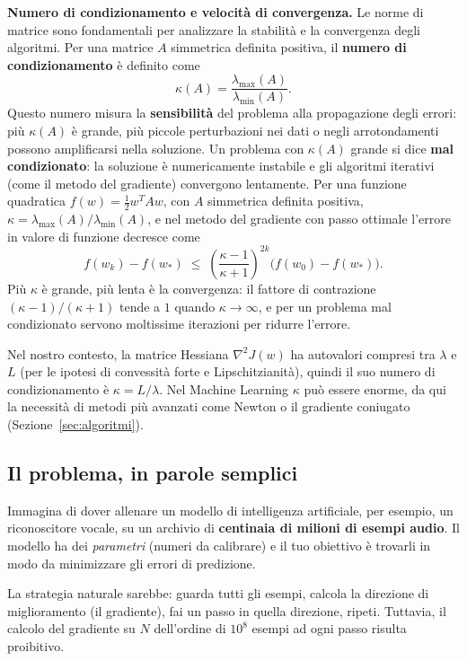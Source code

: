 \documentclass[a4paper,12pt]{article}
\numberwithin{equation}{section}
\numberwithin{figure}{section}
\numberwithin{table}{section}
\begin{document}
 \begin{mnbox}
  \textbf{Numero di condizionamento e velocit\`a di convergenza.}
  Le norme di matrice sono fondamentali per analizzare la stabilit\`a e la
  convergenza degli algoritmi. Per una matrice $A$ simmetrica definita
  positiva, il \textbf{numero di condizionamento} \`e definito come
  \[
  \kappa(A) = \frac{\lambda_{\max}(A)}{\lambda_{\min}(A)}.
  \]
  Questo numero misura la \textbf{sensibilit\`a} del problema alla
  propagazione degli errori: pi\`u $\kappa(A)$ \`e grande, pi\`u piccole
  perturbazioni nei dati o negli arrotondamenti possono amplificarsi nella
  soluzione. Un problema con $\kappa(A)$ grande si dice \textbf{mal
  condizionato}: la soluzione \`e numericamente instabile e gli algoritmi
  iterativi (come il metodo del gradiente) convergono lentamente. Per una
  funzione quadratica $f(w) = \frac12 w^T A w$, con $A$ simmetrica
  definita positiva, $\kappa = \lambda_{\max}(A)/\lambda_{\min}(A)$, e
  nel metodo del gradiente con passo ottimale l'errore in valore di
  funzione decresce come
  \[
    f(w_k) - f(w_*) \;\le\; \left(\frac{\kappa - 1}{\kappa + 1}\right)^{2k}
    \bigl(f(w_0) - f(w_*)\bigr).
  \]
  Pi\`u $\kappa$ \`e grande, pi\`u lenta \`e la convergenza: il fattore di
  contrazione $(\kappa-1)/(\kappa+1)$ tende a $1$ quando
  $\kappa\to\infty$, e per un problema mal condizionato servono
  moltissime iterazioni per ridurre l'errore.

  Nel nostro contesto, la matrice Hessiana $\nabla^2 J(w)$ ha autovalori
  compresi tra $\lambda$ e $L$ (per le ipotesi di convessit\`a forte e
  Lipschitzianit\`a), quindi il suo numero di condizionamento \`e
  $\kappa = L/\lambda$. Nel Machine Learning $\kappa$ pu\`o essere enorme,
  da qui la necessit\`a di metodi pi\`u avanzati come Newton o il gradiente
  coniugato (Sezione~\ref{sec:algoritmi}).
\end{mnbox}

\subsection{Il problema, in parole semplici}

Immagina di dover allenare un modello di intelligenza artificiale, per esempio, un riconoscitore vocale, su un archivio di \textbf{centinaia di milioni di esempi audio}. Il modello ha dei \emph{parametri} (numeri da calibrare) e il tuo obiettivo \`e trovarli in modo da minimizzare gli errori di predizione.

La strategia naturale sarebbe: guarda tutti gli esempi, calcola la direzione di miglioramento (il gradiente), fai un passo in quella direzione, ripeti. Tuttavia, il calcolo del gradiente su $N$ dell'ordine di $10^8$ esempi ad ogni passo risulta proibitivo.
\end{document}
